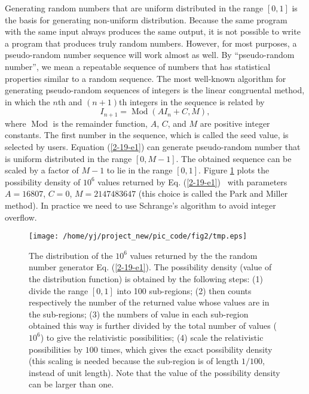 \documentclass{article}
\newcommand{\tmop}[1]{\ensuremath{\operatorname{#1}}}
\begin{document}
Generating random numbers that are uniform distributed in the range $[0, 1]$
is the basis for generating non-uniform distribution. Because the same program
with the same input always produces the same output, it is not possible to
write a program that produces truly random numbers. However, for most
purposes, a pseudo-random number sequence will work almost as well. By
``pseudo-random number'', we mean a repeatable sequence of numbers that has
statistical properties similar to a random sequence. The most well-known
algorithm for generating pseudo-random sequences of integers is the linear
congruental method{\cite{Fitzpatrickcp}}, in which the $n$th and $(n + 1)$th
integers in the sequence is related by
\begin{equation}
  \label{2-19-e1} I_{n + 1} = \tmop{Mod} (A I_n + C, M),
\end{equation}
where $\tmop{Mod}$ is the remainder function, $A$, $C$, and $M$ are positive
integer constants. The first number in the sequence, which is called the seed
value, is selected by users. Equation (\ref{2-19-e1}) can generate
pseudo-random number that is uniform distributed in the range $[0, M - 1]$.
The obtained sequence can be scaled by a factor of $M - 1$ to lie in the range
$[0, 1]$. Figure \ref{7-9-p1} plots the possibility density of $10^6$ values
returned by Eq. (\ref{2-19-e1}) \ with parameters $A = 16807$, $C = 0$, $M =
2147483647$ (this choice is called the Park and Miller method). In practice we
need to use Schrange's algorithm to avoid integer
overflow{\cite{Fitzpatrickcp}}.

\begin{figure}[h]
  \texttt{[image: /home/yj/project\_new/pic\_code/fig2/tmp.eps]}
  \caption{\label{7-9-p1}The distribution of the $10^6$ values returned by the
  the random number generator Eq. (\ref{2-19-e1}). The possibility density
  (value of the distribution function) is obtained by the following steps: (1)
  divide the range $[0, 1]$ into 100 sub-regions; (2) then counts respectively
  the number of the returned value whose values are in the sub-regions; (3)
  the numbers of value in each sub-region obtained this way is further divided
  by the total number of values ($10^6$) to give the relativistic
  possibilities; (4) scale the relativistic possibilities by $100$ times,
  which gives the exact possibility density (this scaling is needed because
  the sub-region is of length $1 / 10$0, instead of unit length). Note that
  the value of the possibility density can be larger than one.}
\end{figure}
\end{document}

